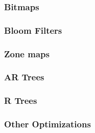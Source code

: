\subsubsection{Bitmaps}




\subsubsection{Bloom Filters}


\subsubsection{Zone maps}


\subsubsection{AR Trees}


\subsubsection{R Trees}


\subsubsection{Other Optimizations}

% 
% 
